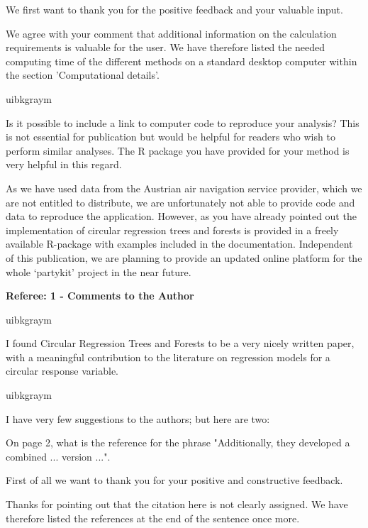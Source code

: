 \documentclass[english, noconfig]{uibklttr}
\newcommand{\section}[1]{{\Large{\textbf{#1}}}}
\newenvironment{re}{
    \begin{color}{uibkgraym}
        \itshape
}{
    \end{color}
}
\begin{document}
We first want to thank you for the positive feedback and your valuable input. 

We agree with your comment that additional information on the calculation
requirements is valuable for the user. We have therefore listed the needed
computing time of the different methods on a standard desktop computer within
the section 'Computational details'.

\vspace{0.5em}
\begin{re}
Is it possible to include a link to computer code to reproduce your
analysis? This is not essential for publication but would be helpful for
readers who wish to perform similar analyses. The R package you have provided
for your method is very helpful in this regard.  
\end{re}

As we have used data from the Austrian air navigation service provider, which
we are not entitled to distribute, we are unfortunately not able to provide
code and data to reproduce the application. However, as you have already
pointed out the implementation of circular regression trees and forests is
provided in a freely available R-package with examples included in the documentation.
Independent of this publication, we are planning to provide an updated online
platform for the whole `partykit' project in the near future.

\newpage

\section{Referee: 1 - Comments to the Author}

\begin{re}
I found Circular Regression Trees and Forests to be a very nicely written
paper, with a meaningful contribution to the literature on regression models
for a circular response variable. 
\end{re}

\begin{re}
I have very few suggestions to the authors; but here are two:

On page 2, what is the reference for the phrase "Additionally, they
developed a combined ... version ...".
\end{re}

First of all we want to thank you for your positive and constructive feedback.

Thanks for pointing out that the citation here is not clearly assigned. We have therefore
listed the references at the end of the sentence once more.
\end{document}
